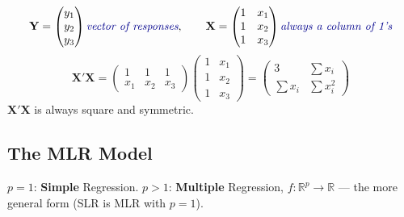 \begin{example}
    \[\mathbf{Y} = \begin{pmatrix}y_1\\y_2\\y_3\end{pmatrix}
    \aside{\text{vector of responses}}, \qquad
    \mathbf{X} = \begin{pmatrix}1 & x_1\\1 & x_2\\1 & x_3\end{pmatrix}
    \aside{\text{always a column of 1's}}\]
    \[\mathbf{X}'\mathbf{X} = \begin{pmatrix}1&1&1\\x_1&x_2&x_3\end{pmatrix}\begin{pmatrix}1 & x_1\\1 & x_2\\1 & x_3\end{pmatrix}
    = \begin{pmatrix}3 & \sum x_i \\ \sum x_i & \sum x_i^2\end{pmatrix}\]
    $\mathbf{X}'\mathbf{X}$ is always square and symmetric.
\end{example}

\subsection{The MLR Model}\label{def:mlr}

\begin{definition}
    $p=1$: \textbf{Simple} Regression. $p>1$: \textbf{Multiple}
    Regression, $f:\mathbb{R}^p\to\mathbb{R}$ --- the more general form
    (SLR is MLR with $p=1$).
\end{definition}

